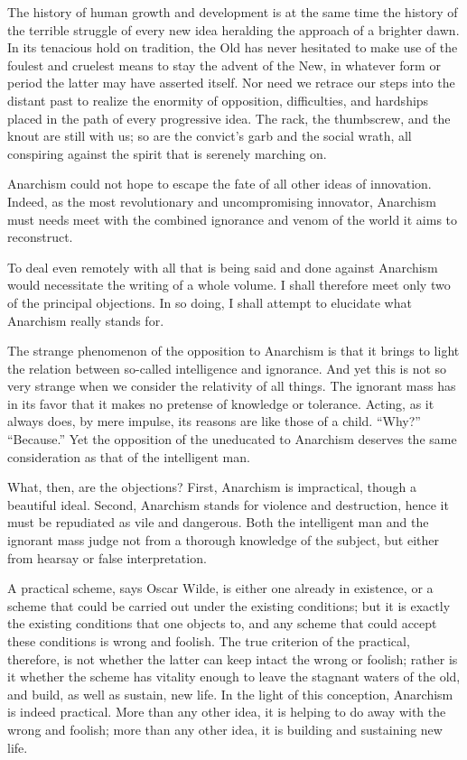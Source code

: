 The history of human growth and development is at the same time the
history of the terrible struggle of every new idea heralding the
approach of a brighter dawn. In its tenacious hold on tradition, the
Old  has never hesitated to make use of the foulest and
cruelest means to stay the advent of the New, in whatever form or
period the latter may have asserted itself. Nor need we retrace our
steps into the distant past to realize the enormity of opposition,
difficulties, and hardships placed in the path of every progressive
idea. The rack, the thumbscrew, and the knout are still with us; so
are the convict's garb and the social wrath, all conspiring against
the spirit that is serenely marching on.

Anarchism could not hope to escape the fate of all other ideas of
innovation. Indeed, as the most revolutionary and uncompromising
innovator, Anarchism must needs meet with the combined ignorance and
venom of the world it aims to reconstruct.

To deal even remotely with all that is being said and done against
Anarchism would necessitate the writing of a whole volume. I shall
therefore meet only two of the principal objections. In so doing, I
shall attempt to elucidate what Anarchism really stands for.

The strange phenomenon of the opposition to Anarchism is that it
brings to light the relation between so-called intelligence and
ignorance. And yet this is not so very strange when we consider the
relativity of all things. The ignorant mass has in its favor that it
makes no pretense of knowledge or tolerance. Acting, as it always
does, by mere impulse, its reasons are like those of a child. ``Why?''
``Because.'' Yet the opposition of the uneducated to Anarchism
deserves the same consideration as that of the intelligent man.

What, then, are the objections? First, Anarchism is
impractical, though a beautiful ideal. Second, Anarchism stands for
violence and destruction, hence it must be repudiated as vile and
dangerous. Both the intelligent man and the ignorant mass judge not
from a thorough knowledge of the subject, but either from hearsay or
false interpretation.

A practical scheme, says Oscar Wilde, is either one already in
existence, or a scheme that could be carried out under the existing
conditions; but it is exactly the existing conditions that one objects
to, and any scheme that could accept these conditions is wrong and
foolish. The true criterion of the practical, therefore, is not
whether the latter can keep intact the wrong or foolish; rather is it
whether the scheme has vitality enough to leave the stagnant waters of
the old, and build, as well as sustain, new life. In the light of this
conception, Anarchism is indeed practical. More than any other idea,
it is helping to do away with the wrong and foolish; more than any
other idea, it is building and sustaining new life.

